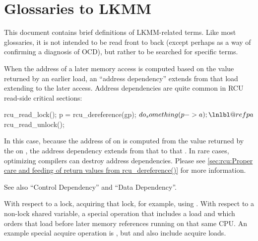 \section{Glossaries to LKMM}

This document contains brief definitions of LKMM-related terms.
Like most glossaries, it is not intended to be read front to back
(except perhaps as a way of confirming a diagnosis of OCD), but rather
to be searched for specific terms.

\begin{description}[style=nextline]
  \item[Address Dependency:]
	When the address of a later memory access is computed
	based on the value returned by an earlier load, an ``address
	dependency'' extends from that load extending to the later access.
	Address dependencies are quite common in RCU read-side critical
	sections:

\begin{fcvlabel}
\begin{VerbatimN}[commandchars=\\\@\$]
	rcu_read_lock();
	p = rcu_dereference(gp);    \lnlbl@rcuderef$
	do_something(p->a);    \lnlbl@refpa$
	rcu_read_unlock();
\end{VerbatimN}
\end{fcvlabel}
        
	\begin{fcvref}
	In this case, because the address of  on 
	is computed from the value returned by the 
	on , the address dependency extends from that
	 to that .
	In rare cases, optimizing compilers can destroy address dependencies.
	Please see \cref{sec:rcu:Proper care and feeding of return values from rcu_dereference()}
	for more information.
        \end{fcvref}

	See also ``Control Dependency'' and ``Data Dependency''.

      \item[Acquire:]
	With respect to a lock, acquiring that lock, for example,
	using .
	With respect to a non-lock shared variable, a special operation
	that includes a load and which orders that load before later memory
	references running on that same CPU.
	An example special acquire operation is ,
	but  and 
	also include acquire loads.


\end{description}
